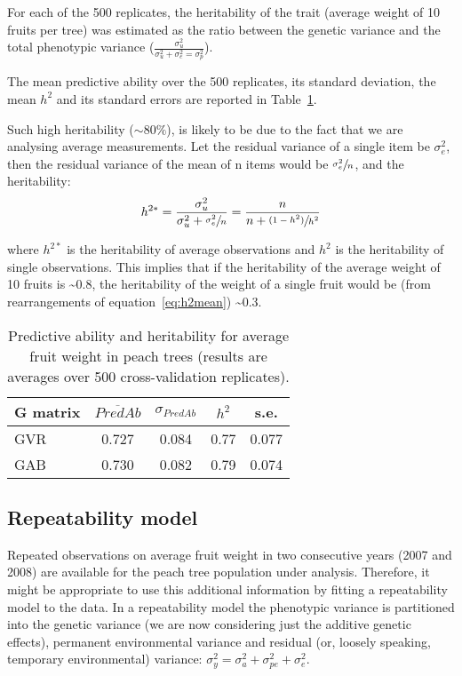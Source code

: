 \documentclass[english,11pt,a4paper]{scrartcl}
\begin{document}
For each of the 500 replicates, the heritability of the trait (average
weight of 10 fruits per tree) was estimated as the ratio between the
genetic variance and the total phenotypic variance ($\frac{\sigma^2_u}{\sigma^2_u+\sigma^2_e=\sigma^2_p}$).

The mean predictive ability over the 500 replicates, its standard
deviation, the mean $h^2$ and its standard errors are reported in
Table~\ref{tab:CrossValGBLUP}.  

Such high heritability ($\sim 80\%$), is likely to be due to the fact
that we are analysing average measurements. Let the residual variance of
a single item be $\sigma^2_e$, then the residual variance of the mean of
n items would be $\sfrac{\sigma^2_e}{n}$, and the heritability: 
\begin{equation} \label{eq:h2mean}
h^{2*}=\frac{\sigma^2_u}{\sigma^2_u+\sfrac{\sigma^2_e}{n}}=\frac{n}{n+\sfrac{(1-h^2)}{h^2}}
\end{equation}

where $h^{2*}$ is the heritability of average observations and $h^2$ is
the heritability of single observations. This implies that if the
heritability of the average weight of 10 fruits is \textasciitilde 0.8,
the heritability of the weight of a single fruit would be (from
rearrangements of equation~\ref{eq:h2mean})
\textasciitilde 0.3.

\begin{table}
\centering
\begin{tabular}{l c c c c}
G matrix & $\overline{PredAb}$ & $\sigma_{PredAb}$ & $h^2$ & s.e. \\
\hline
GVR & 0.727 & 0.084 & 0.77 & 0.077 \\
GAB & 0.730 & 0.082 & 0.79 & 0.074 \\
\end{tabular}
\caption{Predictive ability and heritability for average fruit weight in
  peach trees (results are averages over 500 cross-validation replicates).}
\label{tab:CrossValGBLUP}
\end{table}

\subsection*{Repeatability model}
Repeated observations on average fruit weight in two consecutive years
(2007 and 2008) are available for the peach tree population under
analysis. Therefore, it might be appropriate to use this additional
information by fitting a repeatability model to the data.
In a repeatability model the phenotypic variance is partitioned into
the genetic variance (we are now considering just the additive genetic
effects), permanent
environmental variance and residual (or, loosely speaking,
temporary environmental) variance: $\sigma^2_y=\sigma^2_a+\sigma^2_{pe}+\sigma^2_e$.
\end{document}
